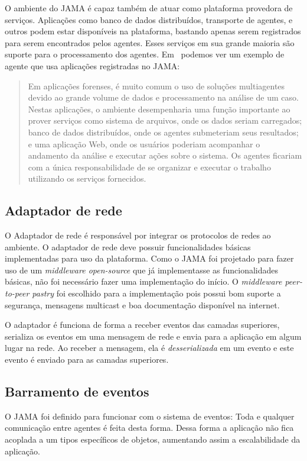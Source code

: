 O ambiente do JAMA é capaz também de atuar como plataforma provedora de serviços. Aplicações como banco de dados distribuídos, transporte de agentes, e outros podem estar disponíveis na plataforma, bastando apenas serem registrados para serem encontrados pelos agentes. Esses serviços em sua grande maioria são suporte para o processamento dos agentes. Em~\cite{parise11} podemos ver um exemplo de agente que usa aplicações registradas no JAMA:

\begin{quote}
Em aplicações forenses, é muito comum o uso de soluções multiagentes devido ao grande volume de dados e processamento na análise de um caso. Nestas aplicações, o ambiente desempenharia uma função importante ao prover serviços como sistema de arquivos, onde os dados seriam carregados; banco de dados distribuídos, onde os agentes submeteriam seus resultados; e uma aplicação Web, onde os usuários poderiam acompanhar o andamento da análise e executar ações sobre o sistema. Os agentes ficariam com a única responsabilidade de se organizar e executar o trabalho utilizando os serviços fornecidos.
\end{quote}

\subsection{Adaptador de rede}

O Adaptador de rede é responsável por integrar os protocolos de redes ao ambiente. O adaptador de rede deve possuir funcionalidades básicas implementadas para uso da plataforma. Como o JAMA foi projetado para fazer uso de um \emph{middleware open-source} que já implementasse as funcionalidades básicas, não foi necessário fazer uma implementação do início. O \emph{middleware peer-to-peer pastry} foi escolhido para a implementação pois possui bom suporte a segurança, mensagens multicast e boa documentação disponível na internet.

O adaptador é funciona de forma a receber eventos das camadas superiores, serializa os eventos em uma mensagem de rede e envia para a aplicação em algum lugar na rede. Ao receber a mensagem, ela é \emph{desserializada} em um evento e este evento é enviado para as camadas superiores.

\subsection{Barramento de eventos}

O JAMA foi definido para funcionar com o sistema de eventos: Toda e qualquer comunicação entre agentes é feita desta forma. Dessa forma a aplicação não fica acoplada a um tipos específicos de objetos, aumentando assim a escalabilidade da aplicação.

